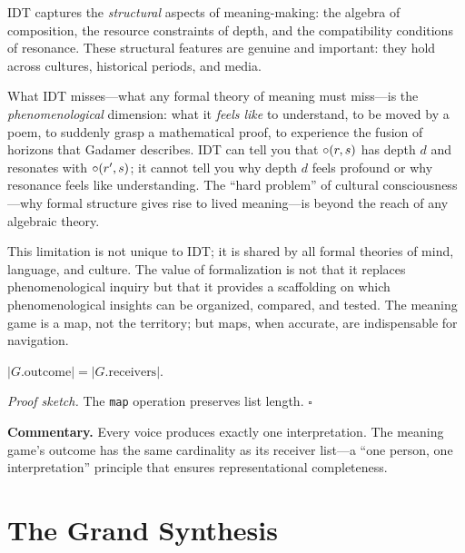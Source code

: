 \begin{remark}
\label{rem:captures_and_misses}
IDT captures the \emph{structural} aspects of meaning-making: the algebra
of composition, the resource constraints of depth, and the compatibility
conditions of resonance.  These structural features are genuine and
important: they hold across cultures, historical periods, and media.

What IDT misses---what any formal theory of meaning must miss---is the
\emph{phenomenological} dimension: what it \emph{feels like} to understand,
to be moved by a poem, to suddenly grasp a mathematical proof, to
experience the fusion of horizons that Gadamer describes.  IDT can tell
you that $\circ(r, s)$ has depth $d$ and resonates with $\circ(r', s)$;
it cannot tell you why depth $d$ feels profound or why resonance feels like
understanding.  The ``hard problem'' of cultural consciousness---why formal
structure gives rise to lived meaning---is beyond the reach of any
algebraic theory.

This limitation is not unique to IDT; it is shared by all formal theories
of mind, language, and culture.  The value of formalization is not that it
replaces phenomenological inquiry but that it provides a scaffolding on
which phenomenological insights can be organized, compared, and tested.
The meaning game is a map, not the territory; but maps, when accurate, are
indispensable for navigation.
\end{remark}

\begin{theorem}
\label{thm:outcome_length}
$|G.\text{outcome}| = |G.\text{receivers}|$.
\end{theorem}

\noindent\textit{Proof sketch.}\quad
The \texttt{map} operation preserves list length.
\hfill$\square$

\medskip

\noindent\textbf{Commentary.}
Every voice produces exactly one interpretation.  The meaning game's
outcome has the same cardinality as its receiver list---a ``one person,
one interpretation'' principle that ensures representational completeness.

\section{The Grand Synthesis}
\label{sec:ch20-synthesis}

